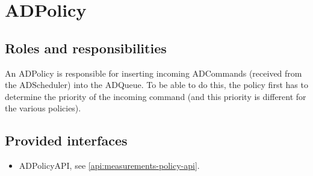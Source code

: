 \section{ADPolicy}
\label{element:ad-policy}

\subsection{Roles and responsibilities}

\npar An ADPolicy is responsible for inserting incoming ADCommands (received
from the ADScheduler) into the ADQueue. To be able to do this, the policy first
has to determine the priority of the incoming command (and this priority is
different for the various policies).

\subsection{Provided interfaces}

\begin{itemize}
  \item ADPolicyAPI, see \ref{api:measurements-policy-api}.
\end{itemize}